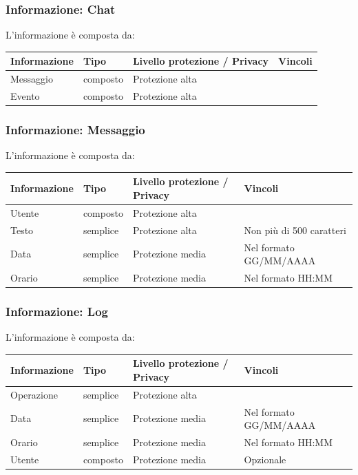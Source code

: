 \documentclass[12pt,a4paper]{report}
\let\oldhyperref\hyperref
\renewcommand{\hyperref}[2][]{\oldhyperref[#1]{\dotuline{#2}}}
\begin{document}
\subsubsection{Informazione: Chat} \label{Chat}
L'informazione \hyperref[Chat]{Chat} è composta da:
\begin{tabularx}{\textwidth}{|p{2.8cm}|p{1.8cm}|p{3.2cm}|X|}
    \hline
    \rowcolor{studyColor} \textbf{Informazione} & \textbf{Tipo} & \textbf{Livello protezione / Privacy} & \textbf{Vincoli} \\ \hline
    \endhead
    Messaggio & composto & Protezione alta & \\ \hline
    Evento & composto & Protezione alta & \\ \hline
\end{tabularx}

\subsubsection{Informazione: Messaggio} \label{Messaggio}
L'informazione \hyperref[Messaggio]{Messaggio} è composta da:
\begin{tabularx}{\textwidth}{|p{2.8cm}|p{1.8cm}|p{3.2cm}|X|}
    \hline
    \rowcolor{studyColor} \textbf{Informazione} & \textbf{Tipo} & \textbf{Livello protezione / Privacy} & \textbf{Vincoli} \\ \hline
    \endhead
    Utente & composto & Protezione alta & \\ \hline
    Testo & semplice & Protezione alta & Non più di 500 caratteri \\ \hline
    Data & semplice & Protezione media & Nel formato GG/MM/AAAA \\ \hline
    Orario & semplice & Protezione media & Nel formato HH:MM \\ \hline
\end{tabularx}

\subsubsection{Informazione: Log} \label{Log}
L'informazione \hyperref[Log]{Log} è composta da:
\begin{tabularx}{\textwidth}{|p{2.8cm}|p{1.8cm}|p{3.2cm}|X|}
    \hline
    \rowcolor{studyColor} \textbf{Informazione} & \textbf{Tipo} & \textbf{Livello protezione / Privacy} & \textbf{Vincoli} \\ \hline
    \endhead
    Operazione & semplice & Protezione alta &  \\ \hline
    Data & semplice & Protezione media & Nel formato GG/MM/AAAA \\ \hline
    Orario & semplice & Protezione media & Nel formato HH:MM \\ \hline
    Utente & composto & Protezione media & Opzionale \\ \hline
\end{tabularx}
\end{document}
